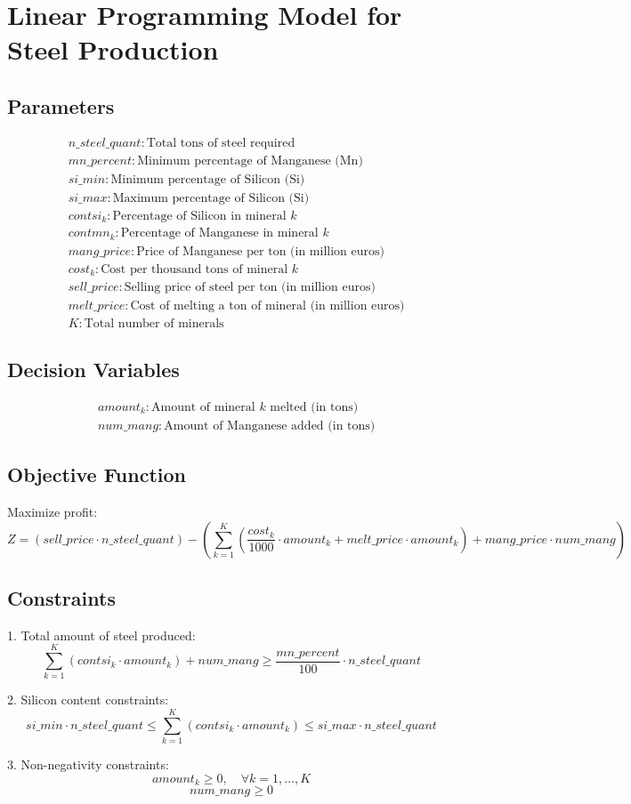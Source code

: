 \documentclass{article}
\begin{document}
\section*{Linear Programming Model for Steel Production}

\subsection*{Parameters}
\begin{align*}
& n\_steel\_quant: \text{Total tons of steel required} \\
& mn\_percent: \text{Minimum percentage of Manganese (Mn)} \\
& si\_min: \text{Minimum percentage of Silicon (Si)} \\
& si\_max: \text{Maximum percentage of Silicon (Si)} \\
& contsi_k: \text{Percentage of Silicon in mineral } k \\
& contmn_k: \text{Percentage of Manganese in mineral } k \\
& mang\_price: \text{Price of Manganese per ton (in million euros)} \\
& cost_k: \text{Cost per thousand tons of mineral } k \\
& sell\_price: \text{Selling price of steel per ton (in million euros)} \\
& melt\_price: \text{Cost of melting a ton of mineral (in million euros)} \\
& K: \text{Total number of minerals}
\end{align*}

\subsection*{Decision Variables}
\begin{align*}
& amount_k: \text{Amount of mineral } k \text{ melted (in tons)} \\
& num\_mang: \text{Amount of Manganese added (in tons)}
\end{align*}

\subsection*{Objective Function}
Maximize profit:
\[
Z = (sell\_price \cdot n\_steel\_quant) - \left( \sum_{k=1}^{K} \left(\frac{cost_k}{1000} \cdot amount_k + melt\_price \cdot amount_k\right) + mang\_price \cdot num\_mang \right)
\]

\subsection*{Constraints}
1. Total amount of steel produced:
\[
\sum_{k=1}^{K} \left(contsi_k \cdot amount_k\right) + num\_mang \geq \frac{mn\_percent}{100} \cdot n\_steel\_quant
\]

2. Silicon content constraints:
\[
si\_min \cdot n\_steel\_quant \leq \sum_{k=1}^{K} \left(contsi_k \cdot amount_k\right) \leq si\_max \cdot n\_steel\_quant
\]

3. Non-negativity constraints:
\[
amount_k \geq 0, \quad \forall k = 1, \ldots, K
\]
\[
num\_mang \geq 0
\]
\end{document}
